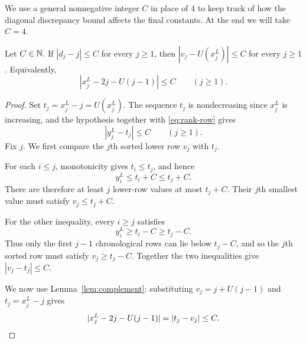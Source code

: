We use a general nonnegative integer $C$ in place of $4$ to keep track of
how the diagonal discrepancy bound affects the final constants. At the end we will take
$C=4$.
\begin{lemma}\label{lem:sorting}
Let $C\in\mathbb N$. If $|d_j-j|\le C$ for every $j\ge1$, then
$|v_j-U(x_j^L)|\le C$ for every $j\ge1$. Equivalently,
\begin{equation}\label{eq:lower-column}
 |x_j^L-2j-U(j-1)|\le C\qquad(j\ge1).
\end{equation}
\end{lemma}
\begin{proof}
Set $t_j=x_j^L-j=U(x_j^L)$. The sequence $t_j$ is nondecreasing since $x_j^L$ is increasing, and the hypothesis together with \eqref{eq:rank-row} gives
\[
 |y_j^L-t_j|\le C\qquad(j\ge1).
\]
Fix $j$. We first compare the $j$th sorted lower row $v_j$ with $t_j$.

For each $i\le j$, monotonicity gives $t_i\le t_j$, and hence
\[
 y_i^L\le t_i+C\le t_j+C.
\]
There are therefore at least $j$ lower-row values at most $t_j+C$.
Their $j$th smallest value must satisfy $v_j\le t_j+C$.

For the other inequality, every $i\ge j$ satisfies
\[
 y_i^L\ge t_i-C\ge t_j-C.
\]
Thus only the first $j-1$ chronological rows can lie below $t_j-C$,
and so the $j$th sorted row
must satisfy $v_j\ge t_j-C$. Together the two inequalities give
$|v_j-t_j|\le C$.

We now use Lemma~\ref{lem:complement}: substituting $v_j=j+U(j-1)$ and
$t_j=x_j^L-j$ gives
\[
 |x_j^L-2j-U(j-1)|=|t_j-v_j|\le C.\qedhere
\]
\end{proof}

